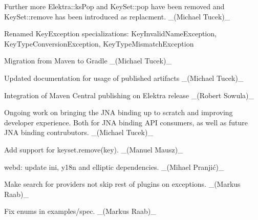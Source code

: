 \begin{DoxyItemize}
Further more {\ttfamily Elektra\+::ks\+Pop} and {\ttfamily Key\+Set\+::pop} have been removed and {\ttfamily Key\+Set\+::remove} has been introduced as replacment. \+\_\+(\+Michael Tucek)\+\_\+
\item Renamed {\ttfamily Key\+Exception} specializations\+: {\ttfamily Key\+Invalid\+Name\+Exception}, {\ttfamily Key\+Type\+Conversion\+Exception}, {\ttfamily Key\+Type\+Mismatch\+Exception}
\item Migration from Maven to Gradle \+\_\+(\+Michael Tucek)\+\_\+
\item Updated documentation for usage of published artifacts \+\_\+(\+Michael Tucek)\+\_\+
\item Integration of Maven Central publishing on Elektra release \+\_\+(\+Robert Sowula)\+\_\+
\end{DoxyItemize}

Ongoing work on bringing the J\+NA binding up to scratch and improving developer experience. Both for J\+NA binding A\+PI consumers, as well as future J\+NA binding contrubutors. \+\_\+(\+Michael Tucek)\+\_\+

Add support for keyset.\+remove(key). \+\_\+(\+Manuel Mausz)\+\_\+


\begin{DoxyItemize}
\item {\ttfamily webd}\+: update {\ttfamily ini}, {\ttfamily y18n} and {\ttfamily elliptic} dependencies. \+\_\+(Mihael Pranjić)\+\_\+
\item Make search for providers not skip rest of plugins on exceptions. \+\_\+(\+Markus Raab)\+\_\+
\end{DoxyItemize}


\begin{DoxyItemize}
\item Fix enums in examples/spec. \+\_\+(\+Markus Raab)\+\_\+
\end{DoxyItemize}


